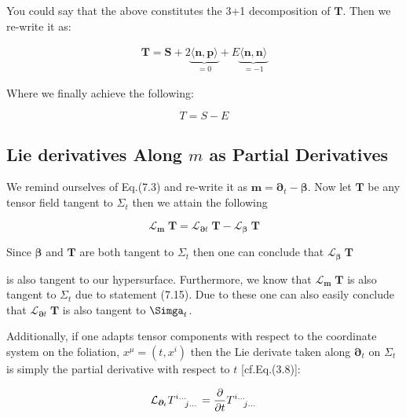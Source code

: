 \documentclass[12pt]{article}
\renewcommand{\vec}[1]{\bm{#1}}
\numberwithin{equation}{section}
\numberwithin{theorem}{subsection}
\begin{document}
You could say that the above constitutes the 3+1 decomposition of $\vec{T}$. Then we re-write it as:

\begin{align*}

    \vec{T} = \vec{S} + 2 \underbrace{\langle \vec{n}, \vec{p} \rangle}_{= 0} + E \underbrace{\langle \vec{n}, \vec{n} \rangle}_{= -1} 

\end{align*}

Where we finally achieve the following:

\begin{equation}

    \boxed{T = S - E}

\end{equation}

\subsection{Lie derivatives Along $m$ as Partial Derivatives}

We remind ourselves of Eq.(7.3) and re-write it as $\vec{m} = \vec{\partial}_{t} - \vec{\beta}$. Now let $\vec{T}$ be any tensor field tangent to $\Sigma_{t}$ then we attain the following  

\begin{equation}

   \mathcal{L}_{\vec{m}} \; \vec{T} = \mathcal{L}_{\vec{\partial}t} \; \vec{T} - \mathcal{L}_{\vec{\beta}} \; \vec{T}

\end{equation}

Since $\vec{\beta}$ and $\vec{T}$ are both tangent to $\Sigma_{t}$ then one can conclude that $\mathcal{L}_{\vec{\beta}} \; \vec{T}$

is also tangent to our hypersurface. Furthermore, we know that $\mathcal{L}_{\vec{m}} \; \vec{T}$ is also tangent to $\Sigma_{t}$ due to statement (7.15). Due to these one can also easily conclude that $\mathcal{L}_{\vec{\partial}t} \; \vec{T}$ is also tangent to $\Simga_{t}$. 

Additionally, if one adapts tensor components with respect to the coordinate system on the foliation, $x^{\mu} = (t,x^{i})$ then the Lie derivate taken along $\vec{\partial}_{t}$ on $\Sigma_{t}$ is simply the partial derivative with respect to $t$ [cf.Eq.(3.8)]:

\begin{equation*}

    \mathcal{L}_{\vec{\partial}_{t}}\tensor{T}{^i^\dots_j_\dots} = \frac{\partial}{\partial t}\tensor{T}{^i^\dots_j_\dots}

\end{equation*}
\end{document}
